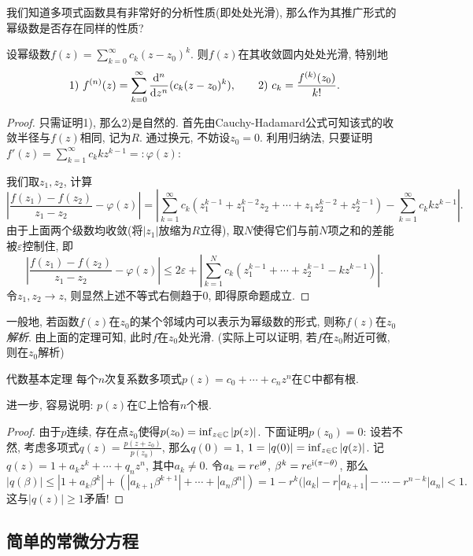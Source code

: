 我们知道多项式函数具有非常好的分析性质(即处处光滑), 那么作为其推广形式的幂级数是否存在同样的性质? 

\begin{theorem}{}
	设幂级数$f(z)=\sum_{k=0}^{\infty} c_k(z-z_0)^k$. 则$f(z)$在其收敛圆内处处光滑, 特别地$$1)~f^{(n)}(z) = \sum_{k=0}^{\infty} \frac{\mathop{}\!\mathrm{d} ^n}{\mathop{}\!\mathrm{d} z^n} (c_k(z-z_0)^k),\qquad 2)~c_k=\frac{f^{(k)}(z_0)}{k!}.$$
\end{theorem}
\begin{proof}
	只需证明1), 那么2)是自然的. 首先由Cauchy-Hadamard公式可知该式的收敛半径与$f(z)$相同, 记为$R$. 通过换元, 不妨设$z_0=0$. 利用归纳法, 只要证明$f'(z)=\sum_{k=1}^{\infty}c_kkz^{k-1}=:\varphi (z)$: 
	
	我们取$z_1,z_2$, 计算$$\left| \frac{f(z_1)-f(z_2)}{z_1-z_2} - \varphi (z) \right| = \left| \sum_{k=1}^{\infty} c_k(z_1^{k-1}+ z_1^{k-2}z_2 + \cdots + z_1z_2^{k-2} + z_2^{k-1}) - \sum_{k=1}^{\infty} c_kkz^{k-1} \right|.$$
	由于上面两个级数均收敛(将$|z_1|$放缩为$R$立得), 取$N$使得它们与前$N$项之和的差能被$\varepsilon$控制住, 即$$\left| \frac{f(z_1)-f(z_2)}{z_1-z_2} - \varphi (z) \right| \leq 2\varepsilon + \left| \sum_{k=1}^{N} c_k(z_1^{k-1} + \cdots + z_2^{k-1} - kz^{k-1}) \right|.$$
	令$z_1,z_2 \to z$, 则显然上述不等式右侧趋于$0$, 即得原命题成立. 
\end{proof}

一般地, 若函数$f(z)$在$z_0$的某个邻域内可以表示为幂级数的形式, 则称$f(z)$在$z_0$\textit{解析}. 由上面的定理可知, 此时$f$在$z_0$处光滑. (实际上可以证明, 若$f$在$z_0$附近可微, 则在$z_0$解析)

\begin{theorem}{代数基本定理}
	每个$n$次复系数多项式$p(z)=c_0+\cdots +c_nz^n$在$\mathbb{C}$中都有根. 
\end{theorem}
\begin{remark}
	进一步, 容易说明: $p(z)$在$\mathbb{C}$上恰有$n$个根. 
\end{remark}
\begin{proof}
	由于$p$连续, 存在点$z_0$使得$p(z_0)=\inf_{z \in \mathbb{C}}|p(z)|$. 下面证明$p(z_0)=0$: 设若不然, 考虑多项式$q(z)=\frac{p(z+z_0)}{p(z_0)}$, 那么$q(0)=1$, $1= |q(0)|=\inf_{z \in \mathbb{C}} |q(z)|$. 记$q(z)=1+a_kz^k+\cdots +q_nz^n$, 其中$a_k \neq 0$. 令$a_k=re^{\mathrm{i} \theta}$, $\beta ^k = re^{\mathrm{i} (\pi-\theta)}$, 那么$$|q(\beta)| \leq |1+a_k\beta ^k| + (|a_{k+1}\beta ^{k+1}| + \cdots + |a_n\beta ^n|) = 1-r^k(|a_k|-r|a_{k+1}|-\cdots -r^{n-k}|a_n| <1.$$
	这与$|q(z)| \geq 1$矛盾! 
\end{proof}

\subsection{简单的常微分方程}

